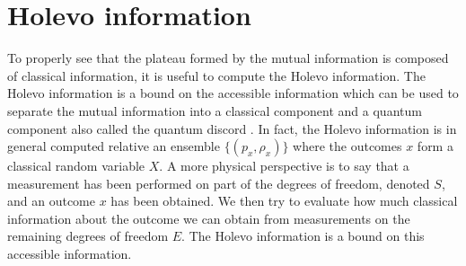 %
\section{Holevo information}
\label{sec/Holevo}

To properly see that the plateau formed by the mutual information is
composed of classical information, it is useful to compute the Holevo
information. The Holevo information is a bound on the accessible information
which can be used to separate the mutual information into a classical
component and a quantum component also called the quantum discord
\cite{Zurek-2013}. In fact, the Holevo information is in general computed
relative an ensemble $\lbrace (p_x, \rho_x) \rbrace$ where the outcomes
$x$ form a classical random variable $X$. A more physical perspective is
to say that a measurement has been performed on part of the degrees of freedom,
denoted $S$, and an outcome $x$ has been obtained. We then try to evaluate how 
much classical information about the outcome we can obtain from 
measurements on the remaining degrees of freedom $E$.
The Holevo information is a bound on this accessible information. 

